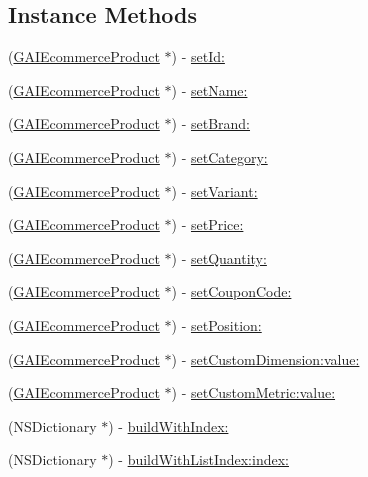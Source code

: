 \subsection*{Instance Methods}
\begin{DoxyCompactItemize}
\item 
(\hyperlink{interface_g_a_i_ecommerce_product}{G\+A\+I\+Ecommerce\+Product} $\ast$) -\/ \hyperlink{interface_g_a_i_ecommerce_product_ab7a68b9ae60da6769a27e9ed38b7791e}{set\+Id\+:}
\item 
(\hyperlink{interface_g_a_i_ecommerce_product}{G\+A\+I\+Ecommerce\+Product} $\ast$) -\/ \hyperlink{interface_g_a_i_ecommerce_product_a0a5f048029cdcd09c2014a10bee1cb65}{set\+Name\+:}
\item 
(\hyperlink{interface_g_a_i_ecommerce_product}{G\+A\+I\+Ecommerce\+Product} $\ast$) -\/ \hyperlink{interface_g_a_i_ecommerce_product_a86fe25148b6e2f292bea2291765518bb}{set\+Brand\+:}
\item 
(\hyperlink{interface_g_a_i_ecommerce_product}{G\+A\+I\+Ecommerce\+Product} $\ast$) -\/ \hyperlink{interface_g_a_i_ecommerce_product_a82cb537f595d2c93390fd2b8c0ffa223}{set\+Category\+:}
\item 
(\hyperlink{interface_g_a_i_ecommerce_product}{G\+A\+I\+Ecommerce\+Product} $\ast$) -\/ \hyperlink{interface_g_a_i_ecommerce_product_aeb93bbdcb44cf4f0fce479bc08abeea9}{set\+Variant\+:}
\item 
(\hyperlink{interface_g_a_i_ecommerce_product}{G\+A\+I\+Ecommerce\+Product} $\ast$) -\/ \hyperlink{interface_g_a_i_ecommerce_product_af6b2de0cb8a61ec76f2fc60cf44181f3}{set\+Price\+:}
\item 
(\hyperlink{interface_g_a_i_ecommerce_product}{G\+A\+I\+Ecommerce\+Product} $\ast$) -\/ \hyperlink{interface_g_a_i_ecommerce_product_aac80209c3d8c6567900f289583e272aa}{set\+Quantity\+:}
\item 
(\hyperlink{interface_g_a_i_ecommerce_product}{G\+A\+I\+Ecommerce\+Product} $\ast$) -\/ \hyperlink{interface_g_a_i_ecommerce_product_a2be17ca76aedd7b6856cb4d7085da559}{set\+Coupon\+Code\+:}
\item 
(\hyperlink{interface_g_a_i_ecommerce_product}{G\+A\+I\+Ecommerce\+Product} $\ast$) -\/ \hyperlink{interface_g_a_i_ecommerce_product_a1fc008512a08f92e9b632dac80f860b2}{set\+Position\+:}
\item 
(\hyperlink{interface_g_a_i_ecommerce_product}{G\+A\+I\+Ecommerce\+Product} $\ast$) -\/ \hyperlink{interface_g_a_i_ecommerce_product_a6e821c684506319ae670ca936ab6ed0c}{set\+Custom\+Dimension\+:value\+:}
\item 
(\hyperlink{interface_g_a_i_ecommerce_product}{G\+A\+I\+Ecommerce\+Product} $\ast$) -\/ \hyperlink{interface_g_a_i_ecommerce_product_aaa2a6a29355051fa001dae01e65aa77d}{set\+Custom\+Metric\+:value\+:}
\item 
(N\+S\+Dictionary $\ast$) -\/ \hyperlink{interface_g_a_i_ecommerce_product_a3ff6808550d4b30b9d83e862fc32f1ad}{build\+With\+Index\+:}
\item 
(N\+S\+Dictionary $\ast$) -\/ \hyperlink{interface_g_a_i_ecommerce_product_aa29f4f1f5c8339397ae37672d9b41f2b}{build\+With\+List\+Index\+:index\+:}
\end{DoxyCompactItemize}


